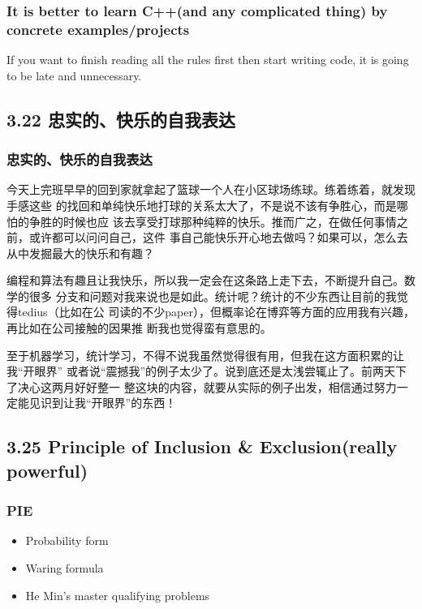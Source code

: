 \documentclass[11pt]{article}
\begin{document}
\subsubsection*{It is better to learn C++(and any complicated thing) by concrete examples/projects}
\label{sec:orgheadline168}
If you want to finish reading all the rules first then start writing code, it is going to be late and unnecessary.
\subsection*{3.22 忠实的、快乐的自我表达}
\label{sec:orgheadline171}
\subsubsection*{忠实的、快乐的自我表达}
\label{sec:orgheadline170}
今天上完班早早的回到家就拿起了篮球一个人在小区球场练球。练着练着，就发现手感这些
的找回和单纯快乐地打球的关系太大了，不是说不该有争胜心，而是哪怕的争胜的时候也应
该去享受打球那种纯粹的快乐。推而广之，在做任何事情之前，或许都可以问问自己，这件
事自己能快乐开心地去做吗？如果可以，怎么去从中发掘最大的快乐和有趣？

编程和算法有趣且让我快乐，所以我一定会在这条路上走下去，不断提升自己。数学的很多
分支和问题对我来说也是如此。统计呢？统计的不少东西让目前的我觉得tedius（比如在公
司读的不少paper），但概率论在博弈等方面的应用我有兴趣，再比如在公司接触的因果推
断我也觉得蛮有意思的。

至于机器学习，统计学习，不得不说我虽然觉得很有用，但我在这方面积累的让我“开眼界”
或者说“震撼我”的例子太少了。说到底还是太浅尝辄止了。前两天下了决心这两月好好整一
整这块的内容，就要从实际的例子出发，相信通过努力一定能见识到让我“开眼界”的东西！
\subsection*{3.25 Principle of Inclusion \& Exclusion(really powerful)}
\label{sec:orgheadline177}

\subsubsection*{PIE}
\label{sec:orgheadline175}
\begin{itemize}
\item Probability form
\label{sec:orgheadline172}
\item Waring formula
\label{sec:orgheadline173}
\item He Min's master qualifying problems
\label{sec:orgheadline174}
\end{itemize}
\end{document}
